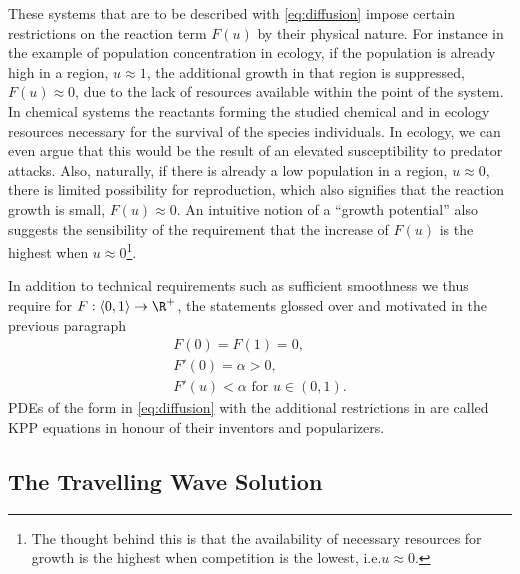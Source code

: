 These systems that are to be described with \cref{eq:diffusion} impose certain restrictions on the reaction term
    \(F(u)\) by their physical nature.
For instance in the example of population concentration in ecology, if the population is already high in a region, 
    \(u \approx 1\), the additional growth in that region is suppressed, \(F(u) \approx 0\), due to the lack of 
    resources available within the point of the system.
In chemical systems the reactants forming the studied chemical and in ecology resources necessary for the survival of 
    the species individuals.
In ecology, we can even argue that this would be the result of an elevated susceptibility to predator attacks.
Also, naturally, if there is already a low population in a region, \(u \approx 0\), there is limited possibility for
    reproduction, which also signifies that the reaction growth is small, \(F(u) \approx 0\).
An intuitive notion of a ``growth potential'' also suggests the sensibility of the requirement that the
    increase of \(F(u)\) is the highest when \(u \approx 0\)\footnote{The thought behind this is that the availability of
    necessary resources for growth is the highest when competition is the lowest, i.e.\@ \(u\approx 0\).}.

In addition to technical requirements such as sufficient smoothness we thus require for 
    \(F: \left< 0,1 \right> \to \R^{+}\), the statements glossed over and motivated in the previous paragraph
\begin{equation}\label{eq:kpp-restrictions}
    \begin{gathered}
    F(0) = F(1) = 0,\\
    F'(0) = \alpha > 0,\\
    F'(u) < \alpha \text{ for } u \in (0, 1).
    \end{gathered}
\end{equation}
\acp{PDE} of the form in \cref{eq:diffusion} with the additional restrictions in  are called 
    \acf{KPP} equations in honour of their inventors and popularizers.


\subsection{The Travelling Wave Solution}%
\label{sub:travelling-wave-solution}

